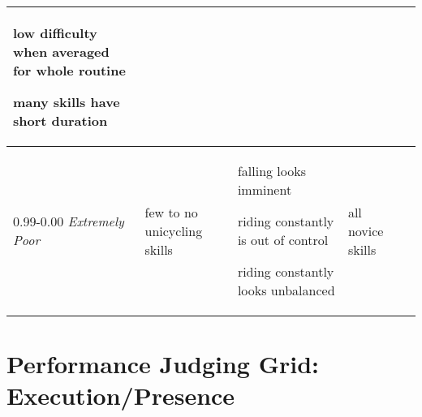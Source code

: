 \begin{minipage}{\textwidth}
\begin{longtable}{|p{1.5cm}|p{5cm}|p{5cm}|p{5cm}|p{1.5cm}|}
\begin{judging_items}%
\item low difficulty when averaged for whole routine
\item many skills have short duration
\end{judging_items} \\
\hline

0.99-0.00 \newline
\emph{Extremely Poor} &

\begin{judging_items}%
\item few to no unicycling skills
\end{judging_items} &

\begin{judging_items}%
\item falling looks imminent
\item riding constantly is out of control
\item riding constantly looks unbalanced
\end{judging_items} &

\begin{judging_items}%
\item all novice skills
\end{judging_items} \\
\hline

\end{longtable}
\endgroup
\end{minipage}

\newpage
\section{Performance Judging Grid: Execution/Presence}

\begingroup
    \fontsize{7pt}{9pt}\selectfont
\setlength{\LTleft}{-2.5cm}

